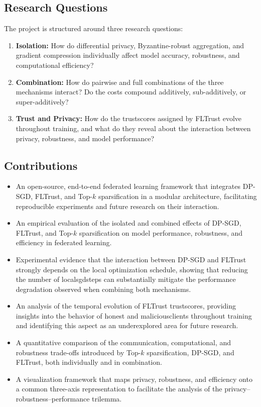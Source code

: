\documentclass[11pt,twocolumn,a4paper,DIV=calc,parskip=half]{scrartcl}
\begin{document}
	\subsection{Research Questions}
	
	The project is structured around three research questions:
	\begin{enumerate}
		\item \textbf{Isolation:} How do differential privacy, Byzantine-robust aggregation, and gradient compression individually affect model accuracy, robustness, and computational efficiency?
		\item \textbf{Combination:} How do pairwise and full combinations of the three
		mechanisms interact? Do the costs compound additively, sub-additively, or
		super-additively?
		\item \textbf{Trust and Privacy:} How do the \glspl{trustscore} assigned by FLTrust evolve throughout training, and what do they reveal about the interaction between privacy, robustness, and model performance?
	\end{enumerate}
	
	\subsection{Contributions}
	
	\begin{itemize}
		\item An open-source, end-to-end federated learning framework that integrates \ac{DP-SGD}, FLTrust, and Top-$k$ sparsification in a modular architecture, facilitating reproducible experiments and future research on their interaction.
		
		\item An empirical evaluation of the isolated and combined effects of \ac{DP-SGD}, FLTrust, and Top-$k$ sparsification on model performance, robustness, and efficiency in federated learning.
		
		\item Experimental evidence that the interaction between \ac{DP-SGD} and FLTrust strongly depends on the local optimization schedule, showing that reducing the number of \glspl{localsgdstep} can substantially mitigate the performance degradation observed when combining both mechanisms.
		
		\item An analysis of the temporal evolution of FLTrust \glspl{trustscore}, providing insights into the behavior of honest and \glspl{maliciousclient} throughout training and identifying this aspect as an underexplored area for future research.
		
		\item A quantitative comparison of the communication, computational, and robustness trade-offs introduced by Top-$k$ sparsification, \ac{DP-SGD}, and FLTrust, both individually and in combination.
		
		\item A visualization framework that maps privacy, robustness, and efficiency onto a common three-axis representation to facilitate the analysis of the privacy--robustness--performance trilemma.
	\end{itemize}
	
\end{document}
